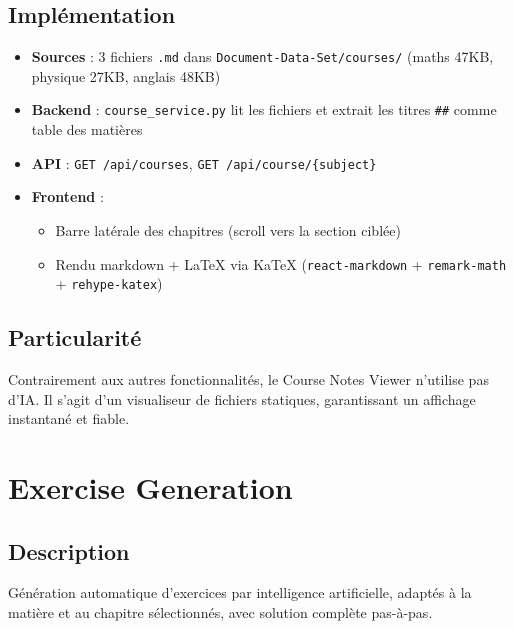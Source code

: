 \documentclass[12pt,a4paper]{report}
\begin{document}
\subsection{Implémentation}
\begin{itemize}
    \item \textbf{Sources} : 3 fichiers \texttt{.md} dans \texttt{Document-Data-Set/courses/} (maths 47KB, physique 27KB, anglais 48KB)
    \item \textbf{Backend} : \texttt{course\_service.py} lit les fichiers et extrait les titres \texttt{##} comme table des matières
    \item \textbf{API} : \texttt{GET /api/courses}, \texttt{GET /api/course/\{subject\}}
    \item \textbf{Frontend} :
    \begin{itemize}
        \item Barre latérale des chapitres (scroll vers la section ciblée)
        \item Rendu markdown + LaTeX via KaTeX (\texttt{react-markdown} + \texttt{remark-math} + \texttt{rehype-katex})
    \end{itemize}
\end{itemize}

\subsection{Particularité}
Contrairement aux autres fonctionnalités, le Course Notes Viewer n'utilise pas d'IA. Il s'agit d'un visualiseur de fichiers statiques, garantissant un affichage instantané et fiable.

\section{Exercise Generation}

\subsection{Description}
Génération automatique d'exercices par intelligence artificielle, adaptés à la matière et au chapitre sélectionnés, avec solution complète pas-à-pas.
\end{document}
